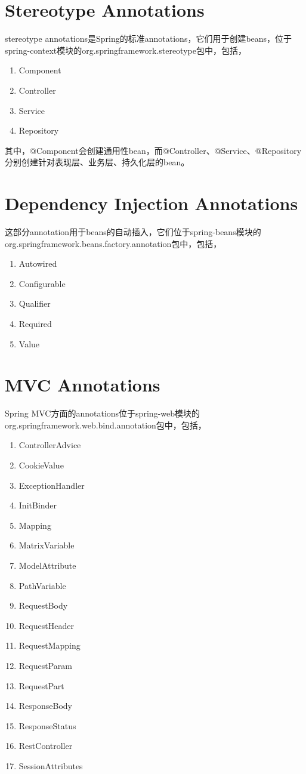 \documentclass[a4paper,11pt]{article}
\begin{document}
\section[Stereotype Annotations]{Stereotype Annotations}
stereotype annotations是Spring的标准annotations，它们用于创建beans，位于
spring-context模块的org.springframework.stereotype包中，包括，
\begin{enumerate}
\item Component
\item Controller
\item Service
\item Repository
\end{enumerate}
其中，@Component会创建通用性bean，而@Controller、@Service、@Repository
分别创建针对表现层、业务层、持久化层的bean。

\section[Dependency Injection Annotations]{Dependency Injection Annotations}
这部分annotation用于beans的自动插入，它们位于spring-beans模块的
org.springframework.beans.factory.annotation包中，包括，
\begin{enumerate}
\item Autowired
\item Configurable
\item Qualifier
\item Required
\item Value
\end{enumerate}

\section[MVC Annotations]{MVC Annotations}
Spring MVC方面的annotations位于spring-web模块的
org.springframework.web.bind.annotation包中，包括，
\begin{enumerate}
\item ControllerAdvice
\item CookieValue
\item ExceptionHandler
\item InitBinder
\item Mapping
\item MatrixVariable
\item ModelAttribute
\item PathVariable
\item RequestBody
\item RequestHeader
\item RequestMapping
\item RequestParam
\item RequestPart
\item ResponseBody
\item ResponseStatus
\item RestController
\item SessionAttributes
\end{enumerate}
\end{document}
